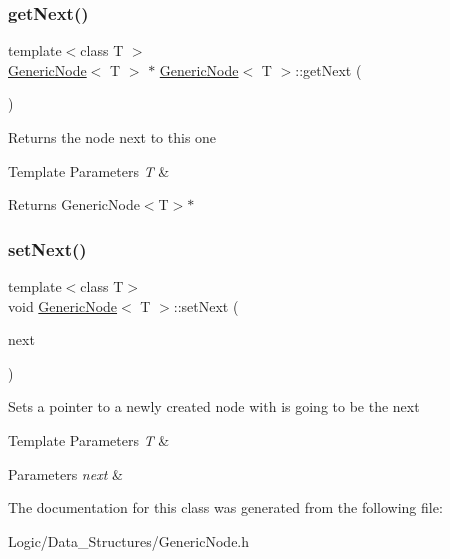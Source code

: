 \subsubsection{\texorpdfstring{getNext()}{getNext()}}
{\footnotesize\ttfamily template$<$class T $>$ \\
\mbox{\hyperlink{class_generic_node}{Generic\+Node}}$<$ T $>$ $\ast$ \mbox{\hyperlink{class_generic_node}{Generic\+Node}}$<$ T $>$\+::get\+Next (\begin{DoxyParamCaption}{ }\end{DoxyParamCaption})}

Returns the node next to this one 
\begin{DoxyTemplParams}{Template Parameters}
{\em T} & \\
\hline
\end{DoxyTemplParams}
\begin{DoxyReturn}{Returns}
Generic\+Node$<$\+T$>$$\ast$ 
\end{DoxyReturn}
\mbox{\label{class_generic_node_affb24675a4b0b2469360a62fab95e7f7}} 
\subsubsection{\texorpdfstring{setNext()}{setNext()}}
{\footnotesize\ttfamily template$<$class T$>$ \\
void \mbox{\hyperlink{class_generic_node}{Generic\+Node}}$<$ T $>$\+::set\+Next (\begin{DoxyParamCaption}\item[{\mbox{\hyperlink{class_generic_node}{Generic\+Node}}$<$ T $>$ $\ast$}]{next }\end{DoxyParamCaption})}

Sets a pointer to a newly created node with is going to be the next 
\begin{DoxyTemplParams}{Template Parameters}
{\em T} & \\
\hline
\end{DoxyTemplParams}

\begin{DoxyParams}{Parameters}
{\em next} & \\
\hline
\end{DoxyParams}


The documentation for this class was generated from the following file\+:\begin{DoxyCompactItemize}
\item 
Logic/\+Data\+\_\+\+Structures/Generic\+Node.\+h\end{DoxyCompactItemize}
